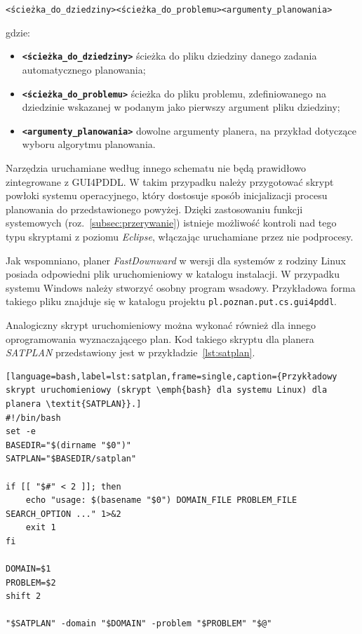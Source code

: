 \noindent
\centerline{\texttt{<ścieżka\_do\_dziedziny>}\textvisiblespace\texttt{<ścieżka\_do\_problemu>}\textvisiblespace\texttt{<argumenty\_planowania>}}


\noindent
gdzie:
\begin{itemize}
\item \textbf{\texttt{<ścieżka\_do\_dziedziny>}}  ścieżka do pliku dziedziny danego zadania automatycznego planowania;
\item \textbf{\texttt{<ścieżka\_do\_problemu>}} ścieżka do pliku problemu, zdefiniowanego na dziedzinie wskazanej w podanym jako pierwszy argument pliku dziedziny;
\item \textbf{\texttt{<argumenty\_planowania>}} dowolne argumenty planera, na przykład dotyczące wyboru algorytmu planowania.
\end{itemize}
Narzędzia uruchamiane według innego schematu nie będą prawidłowo zintegrowane z GUI4PDDL. W takim przypadku należy przygotować skrypt powłoki systemu operacyjnego, który dostosuje sposób inicjalizacji procesu planowania do przedstawionego powyżej. Dzięki zastosowaniu funkcji systemowych (roz.~\ref{subsec:przerywanie}) istnieje możliwość kontroli nad tego typu skryptami z poziomu \emph{Eclipse}, włączając uruchamiane przez nie podprocesy.

Jak wspomniano, planer \emph{FastDownward} w wersji dla systemów z rodziny Linux posiada odpowiedni plik uruchomieniowy w katalogu  instalacji. W przypadku systemu Windows należy stworzyć osobny program wsadowy. Przykładowa forma takiego pliku znajduje się w katalogu  projektu \texttt{pl.poznan.put.cs.gui4pddl}.

Analogiczny skrypt uruchomieniowy można wykonać również dla innego oprogramowania wyznaczającego plan. Kod takiego skryptu dla planera \emph{SATPLAN} przedstawiony jest w przykładzie~\ref{lst:satplan}. 
  
\begin{Code}
\begin{lstlisting}[language=bash,label=lst:satplan,frame=single,caption={Przykładowy skrypt uruchomieniowy (skrypt \emph{bash} dla systemu Linux) dla planera \textit{SATPLAN}}.]
#!/bin/bash
set -e
BASEDIR="$(dirname "$0")"
SATPLAN="$BASEDIR/satplan"

if [[ "$#" < 2 ]]; then
    echo "usage: $(basename "$0") DOMAIN_FILE PROBLEM_FILE SEARCH_OPTION ..." 1>&2
    exit 1
fi

DOMAIN=$1
PROBLEM=$2
shift 2

"$SATPLAN" -domain "$DOMAIN" -problem "$PROBLEM" "$@"
\end{lstlisting}
\end{Code}

